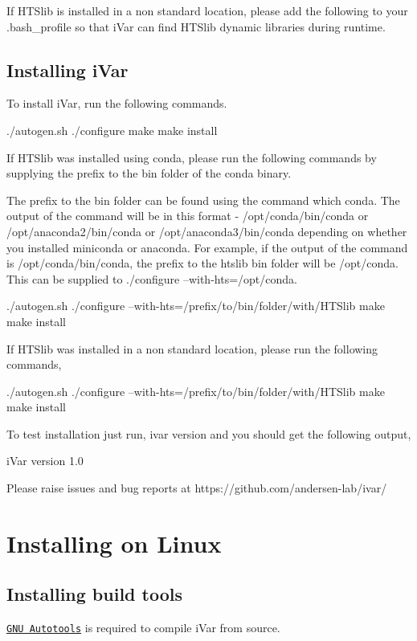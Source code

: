 If H\+T\+Slib is installed in a non standard location, please add the following to your .bash\+\_\+profile so that i\+Var can find H\+T\+Slib dynamic libraries during runtime.


\hypertarget{installpage_autotoc_md5}{}\subsection{Installing i\+Var}\label{installpage_autotoc_md5}
To install i\+Var, run the following commands.


\begin{DoxyCode}
./autogen.sh
./configure
make
make install
\end{DoxyCode}


If H\+T\+Slib was installed using conda, please run the following commands by supplying the prefix to the bin folder of the conda binary.

The prefix to the bin folder can be found using the command {\ttfamily which conda}. The output of the command will be in this format -\/ /opt/conda/bin/conda or /opt/anaconda2/bin/conda or /opt/anaconda3/bin/conda depending on whether you installed miniconda or anaconda. For example, if the output of the command is /opt/conda/bin/conda, the prefix to the htslib bin folder will be /opt/conda. This can be supplied to ./configure --with-\/hts=/opt/conda.


\begin{DoxyCode}
./autogen.sh
./configure --with-hts=/prefix/to/bin/folder/with/HTSlib
make
make install
\end{DoxyCode}


If H\+T\+Slib was installed in a non standard location, please run the following commands,


\begin{DoxyCode}
./autogen.sh
./configure --with-hts=/prefix/to/bin/folder/with/HTSlib
make
make install
\end{DoxyCode}


To test installation just run, {\ttfamily ivar version} and you should get the following output,


\begin{DoxyCode}
iVar version 1.0

Please raise issues and bug reports at https://github.com/andersen-lab/ivar/
\end{DoxyCode}
\hypertarget{installpage_autotoc_md6}{}\section{Installing on Linux}\label{installpage_autotoc_md6}
\hypertarget{installpage_autotoc_md7}{}\subsection{Installing build tools}\label{installpage_autotoc_md7}
\href{https://www.gnu.org/software/automake/manual/html_node/Autotools-Introduction.html#Autotools-Introduction}{\tt G\+NU Autotools} is required to compile i\+Var from source.

